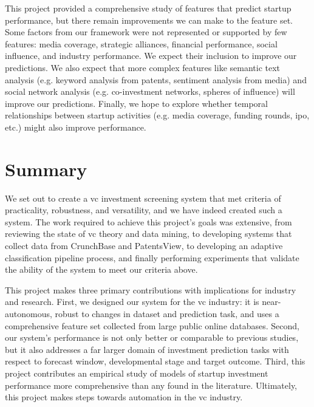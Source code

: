 \documentclass[../thesis/thesis.tex]{subfiles}
\begin{document}
This project provided a comprehensive study of features that predict startup performance, but there remain improvements we can make to the feature set. Some factors from our framework were not represented or supported by few features: media coverage, strategic alliances, financial performance, social influence, and industry performance. We expect their inclusion to improve our predictions. We also expect that more complex features like semantic text analysis (e.g. keyword analysis from patents, sentiment analysis from media) and social network analysis (e.g. co-investment networks, spheres of influence) will improve our predictions. Finally, we hope to explore whether temporal relationships between startup activities (e.g. media coverage, funding rounds, \gls{ipo}, etc.) might also improve performance.

\section{Summary}

We set out to create a \gls{vc} investment screening system that met criteria of practicality, robustness, and versatility, and we have indeed created such a system. The work required to achieve this project's goals was extensive, from reviewing the state of \gls{vc} theory and data mining, to developing systems that collect data from CrunchBase and PatentsView, to developing an adaptive classification pipeline process, and finally performing experiments that validate the ability of the system to meet our criteria above.

This project makes three primary contributions with implications for industry and research. First, we designed our system for the \gls{vc} industry: it is near-autonomous, robust to changes in dataset and prediction task, and uses a comprehensive feature set collected from large public online databases. Second, our system's performance is not only better or comparable to previous studies, but it also addresses a far larger domain of investment prediction tasks with respect to forecast window, developmental stage and target outcome. Third, this project contributes an empirical study of models of startup investment performance more comprehensive than any found in the literature. Ultimately, this project makes steps towards automation in the \gls{vc} industry.

\end{document}
